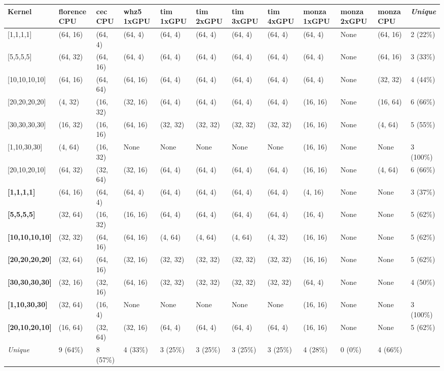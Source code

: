 \begin{tabular}{|p{1.8cm} | p{1cm} | p{1cm} | p{1cm} | p{1cm} | p{1cm} | p{1cm} | p{1cm} | p{1cm} | p{1cm} | p{1cm} | p{1.1cm}|}
\hline
\textbf{Kernel} & \textbf{florence CPU} & \textbf{cec CPU} & \textbf{whz5 1xGPU} & \textbf{tim 1xGPU} & \textbf{tim 2xGPU} & \textbf{tim 3xGPU} & \textbf{tim 4xGPU} & \textbf{monza 1xGPU} & \textbf{monza 2xGPU} & \textbf{monza CPU} & \textit{Unique}\\
\hline
{[}1,1,1,1{]} & (64, 16) & (64, 4) & (64, 4) & (64, 4) & (64, 4) & (64, 4) & (64, 4) & (64, 4) & None & (64, 16) & 2 (22\%)\\
{[}5,5,5,5{]} & (64, 32) & (64, 16) & (64, 4) & (64, 4) & (64, 4) & (64, 4) & (64, 4) & (64, 4) & None & (64, 16) & 3 (33\%)\\
{[}10,10,10,10{]} & (64, 16) & (64, 64) & (64, 16) & (64, 4) & (64, 4) & (64, 4) & (64, 4) & (64, 4) & None & (32, 32) & 4 (44\%)\\
{[}20,20,20,20{]} & (4, 32) & (16, 32) & (32, 16) & (64, 4) & (64, 4) & (64, 4) & (64, 4) & (16, 16) & None & (16, 64) & 6 (66\%)\\
{[}30,30,30,30{]} & (16, 32) & (16, 16) & (64, 16) & (32, 32) & (32, 32) & (32, 32) & (32, 32) & (16, 16) & None & (4, 64) & 5 (55\%)\\
{[}1,10,30,30{]} & (4, 64) & (16, 32) & None & None & None & None & None & (16, 16) & None & None & 3 (100\%)\\
{[}20,10,20,10{]} & (64, 32) & (32, 64) & (32, 16) & (64, 4) & (64, 4) & (64, 4) & (64, 4) & (16, 16) & None & (4, 64) & 6 (66\%)\\
\textbf{{[}1,1,1,1{]}} & (64, 16) & (64, 4) & (64, 4) & (64, 4) & (64, 4) & (64, 4) & (64, 4) & (4, 16) & None & None & 3 (37\%)\\
\textbf{{[}5,5,5,5{]}} & (32, 64) & (16, 32) & (16, 16) & (64, 4) & (64, 4) & (64, 4) & (64, 4) & (16, 4) & None & None & 5 (62\%)\\
\textbf{{[}10,10,10,10{]}} & (32, 32) & (64, 16) & (64, 16) & (4, 64) & (4, 64) & (4, 64) & (4, 32) & (16, 16) & None & None & 5 (62\%)\\
\textbf{{[}20,20,20,20{]}} & (32, 64) & (64, 16) & (32, 16) & (32, 32) & (32, 32) & (32, 32) & (32, 32) & (16, 16) & None & None & 5 (62\%)\\
\textbf{{[}30,30,30,30{]}} & (32, 16) & (32, 16) & (64, 16) & (32, 32) & (32, 32) & (32, 32) & (32, 32) & (64, 4) & None & None & 4 (50\%)\\
\textbf{{[}1,10,30,30{]}} & (32, 64) & (16, 4) & None & None & None & None & None & (16, 16) & None & None & 3 (100\%)\\
\textbf{{[}20,10,20,10{]}} & (16, 64) & (32, 64) & (32, 16) & (64, 4) & (64, 4) & (64, 4) & (64, 4) & (16, 16) & None & None & 5 (62\%)\\
\hline
\textit{Unique} & 9 (64\%) & 8 (57\%) & 4 (33\%) & 3 (25\%) & 3 (25\%) & 3 (25\%) & 3 (25\%) & 4 (28\%) & 0 (0\%) & 4 (66\%) & \\
\hline
\end{tabular}

